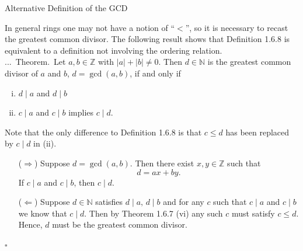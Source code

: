 \documentclass[smaller,hyperref={CJKbookmarks=true}]{beamer}
\newcommand{\N}{\mathbb{N}} \newcommand{\Z}{\mathbb{Z}} \newcommand{\Q}{\mathbb{Q}}
\newenvironment{PROOF}{{\noindent\!\sf\alert{Proof.}}\\}{\hfill$\square$\\}
\newcounter{zhuo}[subsection]
\renewcommand{\thezhuo}{\thesection.\thesubsection.\arabic{zhuo}}
\newenvironment{THEOREM}{\stepcounter{zhuo}\alert{\thezhuo.~Theorem.\,}}{}
\begin{document}
\begin{frame}{Alternative Definition of the GCD}
\begin{spacing}{1.1}
\vspace*{11pt}
In general rings one may not have a notion of ``$<$'', so it is necessary to
recast the greatest common divisor. The following result shows that
Definition 1.6.8 is equivalent to a definition not involving the ordering relation.\\[4pt]
\begin{THEOREM}
Let $a,b\in\Z$ with $|a|+|b|\neq0$. Then $d\in\N$ is the greatest common divisor of $a$ and $b$, $d=\gcd(a,b)$, if and only if
\begin{enumerate}[(i)]
  \item $d\mid a$ and $d\mid b$
  \item $c\mid a$ and $c\mid b$ implies $c\mid d$.
\end{enumerate}
\end{THEOREM}
Note that the only difference to Definition 1.6.8 is that $c\leq d$ has been replaced by $c\mid d$ in (ii).
\newpage
\begin{PROOF}
\begin{itemize}
  \item[($\Rightarrow$)] Suppose $d=\gcd(a,b)$. Then there exist $x,y\in\Z$ such that
      \[d=ax+by.\]
      If $c\mid a$ and $c\mid b$, then $c\mid d$.
  \item[($\Leftarrow$)] Suppose $d\in\N$ satisfies $d\mid a,\,d\mid b$ and for any $c$ such that $c\mid a$ and $c\mid b$ we know that $c\mid d$. Then by Theorem 1.6.7 (vi) any such $c$ must satisfy $c\leq d$. Hence, $d$ must be the greatest common divisor.
\end{itemize}
\end{PROOF}
\end{spacing}
\end{frame}
\end{document}
